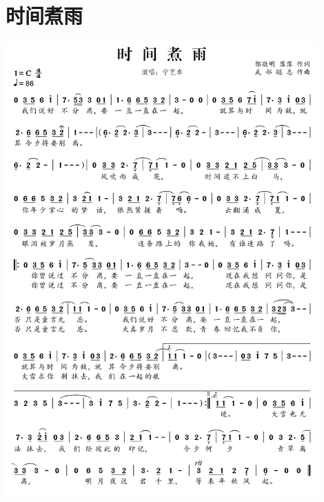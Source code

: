 \documentclass[cn,pad,twocol]{elegantbook}
\begin{document}
\section{时间煮雨} \includegraphics[width=0.9\textwidth]{macos/2020武部聪志-时间煮雨.png}
\end{document}
